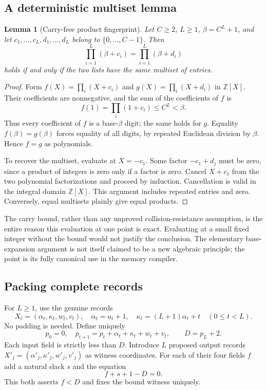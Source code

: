 \documentclass[11pt,a4paper]{article}
\newtheorem{lemma}[lemma]{Lemma}
\theoremstyle{definition}
\theoremstyle{remark}
\newcommand{\Z}{\mathbb Z}
\begin{document}
\subsection{A deterministic multiset lemma}
\begin{lemma}[Carry-free product fingerprint]\label{cdc:mem:lem:fingerprint}
Let $C\geq2$, $L\geq1$, $\beta=C^L+1$, and let
$c_1,\ldots,c_L,d_1,\ldots,d_L$ belong to $\{0,\ldots,C-1\}$. Then
\begin{equation}\label{cdc:mem:eq:fingerprint}
 \prod_{i=1}^L(\beta+c_i)=\prod_{i=1}^L(\beta+d_i)
\end{equation}
holds if and only if the two lists have the same multiset of entries.
\end{lemma}
\begin{proof}
Form $f(X)=\prod_i(X+c_i)$ and $g(X)=\prod_i(X+d_i)$ in $\Z[X]$.
Their coefficients are nonnegative, and the sum of the coefficients of $f$ is
\[
 f(1)=\prod_i(1+c_i)\leq C^L<\beta.
\]
Thus every coefficient of $f$ is a base-$\beta$ digit; the same holds for $g$.
Equality $f(\beta)=g(\beta)$ forces equality of all digits, by repeated Euclidean
division by $\beta$. Hence $f=g$ as polynomials.

To recover the multiset, evaluate at $X=-c_1$. Some factor $-c_1+d_j$ must be
zero, since a product of integers is zero only if a factor is zero. Cancel
$X+c_1$ from the two polynomial factorizations and proceed by induction.
Cancellation is valid in the integral domain $\Z[X]$. This argument includes
repeated entries and zero. Conversely, equal multisets plainly give equal
products.
\end{proof}

The carry bound, rather than any unproved collision-resistance assumption, is
the entire reason this evaluation at one point is exact. Evaluating at a small
fixed integer without the bound would not justify the conclusion. The elementary
base-expansion argument is not itself claimed to be a new algebraic principle;
the point is its fully canonical use in the memory compiler.

\subsection{Packing complete records}
For $L\geq1$, use the genuine records
\[
 X_t=(\alpha_t,\kappa_t,w_t,v_t),\quad
 \alpha_t=a_t+1,\quad\kappa_t=(L+1)\alpha_t+t\quad(0\leq t<L).
\]
No padding is needed. Define uniquely
\begin{equation}\label{cdc:mem:eq:linear-radix}
 p_0=0,\quad p_{t+1}=p_t+\alpha_t+\kappa_t+w_t+v_t,\qquad D=p_L+2.
\end{equation}
Each input field is strictly less than $D$. Introduce $L$ proposed output
records $X'_j=(\alpha'_j,\kappa'_j,w'_j,v'_j)$ as witness coordinates. For each
of their four fields $f$ add a natural slack $s$ and the equation
\begin{equation}\label{cdc:mem:eq:digit-bound}
 f+s+1-D=0.
\end{equation}
This both asserts $f<D$ and fixes the bound witness uniquely.
\end{document}
